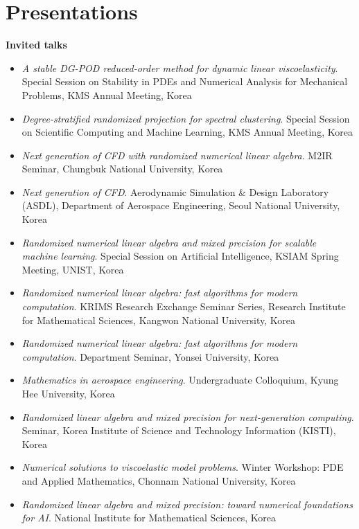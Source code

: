 \documentclass[11pt, a4paper]{article}
\newcommand{\cvsubheading}[1]{%
    \needspace{3\baselineskip}\par\vspace{0.18cm}%
    {\sffamily\bfseries\small\color{accent!85!black}#1}\par\vspace{0.12cm}%
}
\newlength{\datecolwidth}
\newenvironment{cvlist}{%
    \begin{itemize}[
        leftmargin=\datecolwidth,
        labelwidth=\datecolwidth-0.3cm,
        labelsep=0.3cm,
        align=left,
        font=\sffamily\small\color{accent},
        topsep=0pt, partopsep=0pt, parsep=0pt,
        itemsep=0.20cm
    ]
}{\end{itemize}}
\begin{document}
\section{Presentations}

\cvsubheading{Invited talks}
\begin{cvlist}
    \item[Oct 2026] \textit{A stable DG-POD reduced-order method for dynamic linear viscoelasticity}. Special Session on Stability in PDEs and Numerical Analysis for Mechanical Problems, KMS Annual Meeting, Korea
    \item[Oct 2026] \textit{Degree-stratified randomized projection for spectral clustering}. Special Session on Scientific Computing and Machine Learning, KMS Annual Meeting, Korea
    \item[Oct 2026] \textit{Next generation of CFD with randomized numerical linear algebra}. M2IR Seminar, Chungbuk National University, Korea
    \item[Sep 2026] \textit{Next generation of CFD}. Aerodynamic Simulation \& Design Laboratory (ASDL), Department of Aerospace Engineering, Seoul National University, Korea
    \item[May 2026] \textit{Randomized numerical linear algebra and mixed precision for scalable machine learning}. Special Session on Artificial Intelligence, KSIAM Spring Meeting, UNIST, Korea
    \item[May 2026] \textit{Randomized numerical linear algebra: fast algorithms for modern computation}. KRIMS Research Exchange Seminar Series, Research Institute for Mathematical Sciences, Kangwon National University, Korea
    \item[Apr 2026] \textit{Randomized numerical linear algebra: fast algorithms for modern computation}. Department Seminar, Yonsei University, Korea
    \item[Apr 2026] \textit{Mathematics in aerospace engineering}. Undergraduate Colloquium, Kyung Hee University, Korea
    \item[Feb 2026] \textit{Randomized linear algebra and mixed precision for next-generation computing}. Seminar, Korea Institute of Science and Technology Information (KISTI), Korea
    \item[Jan 2026] \textit{Numerical solutions to viscoelastic model problems}. Winter Workshop: PDE and Applied Mathematics, Chonnam National University, Korea
    \item[Nov 2025] \textit{Randomized linear algebra and mixed precision: toward numerical foundations for AI}. National Institute for Mathematical Sciences, Korea

\end{cvlist}
\end{document}
